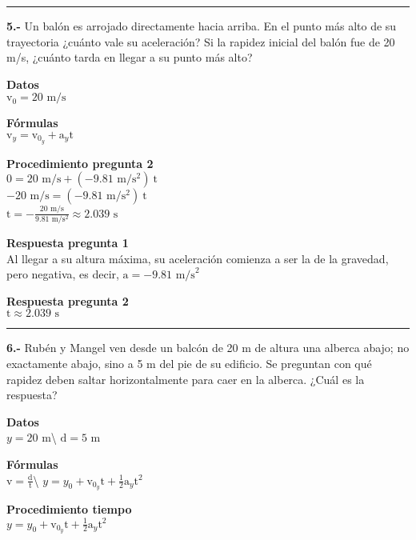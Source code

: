 \documentclass[
]{article}
\begin{document}
\begin{center}\rule{0.5\linewidth}{0.5pt}\end{center}

\textbf{5.-} Un balón es arrojado directamente hacia arriba. En el punto
más alto de su trayectoria ¿cuánto vale su aceleración? Si la rapidez
inicial del balón fue de 20 m/s, ¿cuánto tarda en llegar a su punto más
alto?

\textbf{Datos}\\
{\(\text{v}_{0} = 20\text{~m/s}\)}

\textbf{Fórmulas}\\
{\(\text{v}_{y} = \text{v}_{0_{y}} + \text{a}_{y}\text{t}\)}

\textbf{Procedimiento pregunta 2}\\
{\(0 = 20\text{~m/s} + ( - 9.81\text{~m/}\text{s}^{2})\ \text{t}\)}\\
{\(- 20\text{~m/s} = ( - 9.81\text{~m/}\text{s}^{2})\ \text{t}\)}\\
{\(\text{t} = - \frac{20\text{~m/s}}{9.81\text{~m}/\text{s}^{2}} \approx 2.039\text{~s}\)}

\textbf{Respuesta pregunta 1}\\
Al llegar a su altura máxima, su aceleración comienza a ser la de la
gravedad, pero negativa, es decir,
{\(\text{a} = - 9.81\text{~m/s}^{2}\)}

\textbf{Respuesta pregunta 2}\\
{\(\text{t} \approx 2.039\text{~s}\)}

\begin{center}\rule{0.5\linewidth}{0.5pt}\end{center}

\textbf{6.-} Rubén y Mangel ven desde un balcón de 20 m de altura una
alberca abajo; no exactamente abajo, sino a 5 m del pie de su edificio.
Se preguntan con qué rapidez deben saltar horizontalmente para caer en
la alberca. ¿Cuál es la respuesta?

\textbf{Datos}\\
{\(y = 20\text{~m}\)}\textbackslash{} {\(\text{d} = 5\text{~m}\)}

\textbf{Fórmulas}\\
{\(\text{v} = \frac{\text{d}}{\text{t}}\)}\textbackslash{}
{\(y = y_{0} + \text{v}_{0_{y}}\text{t} + \frac{1}{2}\text{a}_{y}\text{t}^{2}\)}

\textbf{Procedimiento tiempo}\\
{\(y = y_{0} + \text{v}_{0_{y}}\text{t} + \frac{1}{2}\text{a}_{y}\text{t}^{2}\)}
\end{document}
